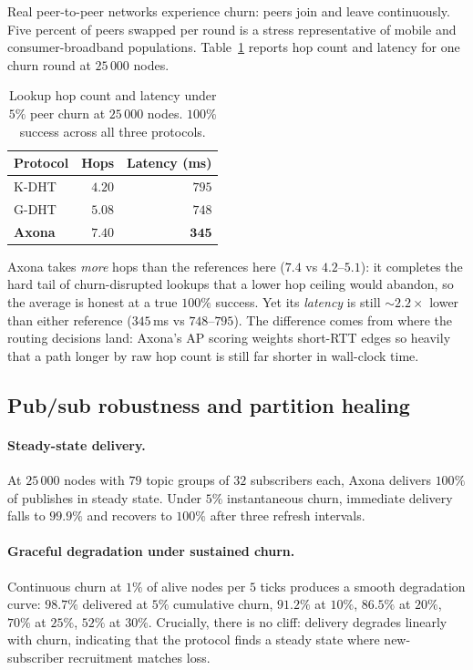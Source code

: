 \documentclass[conference]{IEEEtran}
\newcommand{\axona}{Axona\xspace}
\newcommand{\KDHT}{K-DHT\xspace}
\newcommand{\GDHT}{G-DHT\xspace}
\begin{document}
Real peer-to-peer networks experience churn: peers join and
leave continuously.  Five percent of peers swapped per round is
a stress representative of mobile and consumer-broadband
populations.  Table~\ref{tab:churn} reports hop count and
latency for one churn round at $25\,000$ nodes.

\begin{table}[t]
\centering
\caption{Lookup hop count and latency under $5\%$ peer churn at
$25\,000$ nodes.  $100\%$ success across all three protocols.}
\label{tab:churn}
\small
\begin{tabular}{@{}lrr@{}}
\toprule
\textbf{Protocol} & \textbf{Hops} & \textbf{Latency (ms)} \\
\midrule
\KDHT & $4.20$ & $795$ \\
\GDHT & $5.08$ & $748$ \\
\textbf{\axona} & $\mathbf{7.40}$ & $\mathbf{345}$ \\
\bottomrule
\end{tabular}
\end{table}

\axona takes \emph{more} hops than the references here ($7.4$
vs $4.2$--$5.1$): it completes the hard tail of churn-disrupted
lookups that a lower hop ceiling would abandon, so the average
is honest at a true $100\%$ success.  Yet its \emph{latency} is
still $\sim\!2.2\times$ lower than either reference ($345$\,ms
vs $748$--$795$).  The difference comes from where the routing
decisions land: \axona's AP scoring weights short-RTT edges so
heavily that a path longer by raw hop count is still far shorter
in wall-clock time.

\subsection{Pub/sub robustness and partition healing}
\label{sec:eval-slice}

\paragraph{Steady-state delivery.}
At $25\,000$ nodes with $79$ topic groups of $32$ subscribers
each, \axona delivers $100\%$ of publishes in steady state.
Under $5\%$ instantaneous churn, immediate delivery falls to
$99.9\%$ and recovers to $100\%$ after three refresh intervals.

\paragraph{Graceful degradation under sustained churn.}
Continuous churn at $1\%$ of alive nodes per $5$ ticks
produces a smooth degradation curve: $98.7\%$ delivered at
$5\%$ cumulative churn, $91.2\%$ at $10\%$, $86.5\%$ at $20\%$,
$70\%$ at $25\%$, $52\%$ at $30\%$.  Crucially, there is no
cliff: delivery degrades linearly with churn, indicating that
the protocol finds a steady state where new-subscriber
recruitment matches loss.
\end{document}
